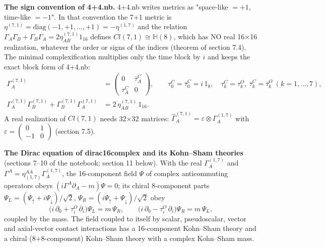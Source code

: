 \documentclass[10pt,a4paper]{article}
\begin{document}
\textbf{The sign convention of 4+4.nb.} 4+4.nb writes metrics as "space-like $=+1$, time-like $=-1$". In that convention the 7+1 metric is $\eta^{(7,1)}=\mathrm{diag}(-1,+1,\dots,+1)=-\eta^{(1,7)}$ and the relation $\Gamma_A\Gamma_B+\Gamma_B\Gamma_A=2\eta^{(7,1)}_{AB}1_{16}$ defines $Cl(7,1)\cong\mathbb{H}(8)$, which has NO real 16×16 realization, whatever the order or signs of the indices (theorem of section 7.4). The minimal complexification multiplies only the time block by $i$ and keeps the exact block form of 4+4.nb:
\begin{align*}
\Gamma^{(7,1)}_A&=\begin{pmatrix}0&\bar\tau^{C}_A\\ \tau^{C}_A&0\end{pmatrix},\qquad \tau^{C}_0=\bar\tau^{C}_0=i\,1_8,\quad \tau^{C}_k=\tau^{O}_k,\ \bar\tau^{C}_k=\bar\tau^{O}_k\ (k=1,\dots,7), \\
\Gamma^{(7,1)}_A\Gamma^{(7,1)}_B+\Gamma^{(7,1)}_B\Gamma^{(7,1)}_A&=2\,\eta^{(7,1)}_{AB}\,1_{16}.
\end{align*}
A real realization of $Cl(7,1)$ needs 32×32 matrices: $\widehat\Gamma^{(7,1)}_A=\varepsilon\otimes\Gamma^{(1,7)}_A$ with $\varepsilon=\left(\begin{smallmatrix}0&1\\-1&0\end{smallmatrix}\right)$ (section 7.5).

\textbf{The Dirac equation of dirac16complex and its Kohn–Sham theories} (sections 7–10 of the notebook; section 11 below). With the real $\Gamma^{(1,7)}_A$ and $\Gamma^{A}=\eta_{(1,7)}^{AA}\Gamma^{(1,7)}_A$, the 16-component field $\Psi$ of complex anticommuting operators obeys $(i\Gamma^{A}\partial_A-m)\Psi=0$; its chiral 8-component parts $\Psi_L=(\Psi_\uparrow+i\Psi_\downarrow)/\sqrt2$, $\Psi_R=(i\Psi_\uparrow+\Psi_\downarrow)/\sqrt2$ obey
\begin{equation*}
\big(i\,\partial_0+\tau^{O}_i\,\partial_i\big)\Psi_L=m\,\Psi_R,\qquad \big(i\,\partial_0-\tau^{O}_i\,\partial_i\big)\Psi_R=m\,\Psi_L,
\end{equation*}
coupled by the mass. The field coupled to itself by scalar, pseudoscalar, vector and axial-vector contact interactions has a 16-component Kohn–Sham theory and a chiral (8+8-component) Kohn–Sham theory with a complex Kohn–Sham mass.
\end{document}
